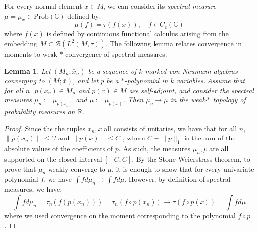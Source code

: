 \documentclass[11pt]{amsart}
\newcommand{\R}{{\mathbb{R}}}
\newcommand{\C}{{\mathbb{C}}}
\newtheorem{lemma}[theorem]{Lemma}
\theoremstyle{definition}
\newtheorem{definition}[theorem]{Definition}
\theoremstyle{remark}
\theoremstyle{definition}
\begin{document}

For every normal element $x\in M$, we can consider its \emph{spectral measure}
$\mu=\mu_{x}\in \mathrm {Prob} (\C) $ defined by:
\[
\mu(f)=\tau\left(f(x)\right),\,\,\,\,\,\,f\in C_{c}(\C)
\]
where $f(x)$ is defined by continuous functional calculus arising from the embedding $M\subset \mathcal {B} (L^2(M,\tau))$.
The following lemma relates convergence in moments to weak-$*$ convergence of spectral measures.  

\begin{lemma}\label{lem:convergence of spectral measures}
Let $(M_n;\bar x_n)$ be a sequence of $k$-marked von Neumann algebras converging to $(M;\bar x)$, and let $p$ be a $*$-polynomial in $k$ variables. Assume that for all $n$, $p(\bar{x}_n) \in M_n$ and $p(\bar x)\in M$ are self-adjoint, and consider the spectral measures $\mu_n:=\mu_{p(\bar{x}_n)}$ and $\mu:=\mu_{p(\bar{x})}$. Then $\mu_n\to \mu$ in the weak-$*$ topology of probability measures on $\R$. 
\end{lemma}

\begin{proof}
Since the the tuples $\bar x_n, \bar x$ all consists of unitaries, we have that for all $n$, $\| p(\bar x_n)\| \leq C$ and $\| p(\bar x) \| \leq C$ , where $C = \| p \|_1$ is the sum of the absolute values of the coefficients of $p$.
As such, the measures $\mu_n, \mu$ are all supported on the closed interval $[-C,C]$.
By the Stone-Weierstrass theorem, to prove that $\mu_n$ weakly converge to $\mu$, it is enough to show that for every univariate polynomial $f$, we have $\int f d\mu_n \to \int f d\mu $.
However, by definition of spectral measures, we have:
$$ \int f d\mu_n = \tau_n( f(p(\bar x_n))) = \tau_n(f\circ p(\bar x_n)) \to \tau(f\circ p(\bar x)) = \int f d\mu $$
where we used  convergence on the moment corresponding to the polynomial $f\circ p$. 
\end{proof}
\end{document}
